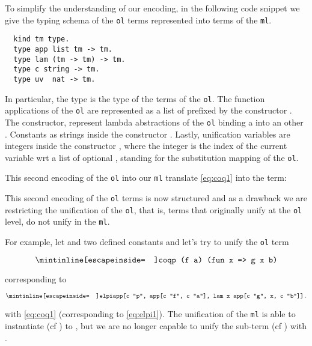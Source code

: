 \documentclass[acmengage]{acmart}
\newcommand*{\acronym}[1]{\texttt{#1}\xspace}
\def\ol{\acronym{ol}} %
\def\ml{\acronym{ml}} %
\begin{document}
To simplify the understanding of our encoding, in the following code snippet
we give the typing schema of the \ol terms represented into terms of the \ml. 

\begin{verbatim}
  kind tm type.
  type app list tm -> tm.
  type lam (tm -> tm) -> tm.
  type c string -> tm.
  type uv  nat -> tm.
\end{verbatim}

In particular, the type  is the type of the terms of the \ol. The
function applications of the \ol are represented as a list of 
prefixed by the constructor . The  constructor,
represent lambda abstractions of the \ol binding a  into an other
. Constants as strings inside the constructor . Lastly,
unification variables are integers inside the constructor , where the
integer is the index of the current variable wrt a list of optional ,
standing for the substitution mapping of the \ol.

This second encoding of the \ol into our \ml translate \cref{eq:coq1} into
the term:


This second encoding of the \ol terms is now structured and as a drawback we are
restricting the unification of the \ol, that is, terms that originally unify
at the \ol level, do not unify in the \ml.

For example, let  and  two defined constants and let's try to
unify the \ol term

\begin{equation}
  \texttt{\coqIn{p (f a) (fun x => g x b)}}
\end{equation}

\noindent corresponding to 

\begin{equation}
  \texttt{\elpiIn{app[c "p", app[c "f", c "a"], lam x\ app[c "g", x, c "b"]].}}
  \label{eq:elpi2}
\end{equation}

\noindent with \cref{eq:coq1} (corresponding to \cref{eq:elpi1}). The
unification of the \ml is able to instantiate  (cf ) to
, but we are no longer capable to unify the sub-term
 (cf ) with . 
\end{document}
